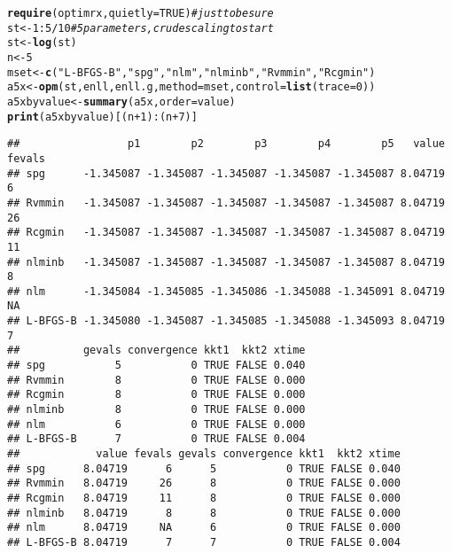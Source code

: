 \documentclass[11pt]{article}\usepackage[]{graphicx}\usepackage[]{color}
\makeatletter
\newcommand{\hlnum}[1]{\textcolor[rgb]{0.686,0.059,0.569}{#1}}%
\newcommand{\hlstr}[1]{\textcolor[rgb]{0.192,0.494,0.8}{#1}}%
\newcommand{\hlcom}[1]{\textcolor[rgb]{0.678,0.584,0.686}{\textit{#1}}}%
\newcommand{\hlopt}[1]{\textcolor[rgb]{0,0,0}{#1}}%
\newcommand{\hlstd}[1]{\textcolor[rgb]{0.345,0.345,0.345}{#1}}%
\newcommand{\hlkwb}[1]{\textcolor[rgb]{0.69,0.353,0.396}{#1}}%
\newcommand{\hlkwc}[1]{\textcolor[rgb]{0.333,0.667,0.333}{#1}}%
\newcommand{\hlkwd}[1]{\textcolor[rgb]{0.737,0.353,0.396}{\textbf{#1}}}%
\newenvironment{kframe}{%
 \def\at@end@of@kframe{}%
 \ifinner\ifhmode%
  \def\at@end@of@kframe{\end{minipage}}%
  \begin{minipage}{\columnwidth}%
 \fi\fi%
 \def\FrameCommand##1{\hskip\@totalleftmargin \hskip-\fboxsep
 \colorbox{shadecolor}{##1}\hskip-\fboxsep
     \hskip-\linewidth \hskip-\@totalleftmargin \hskip\columnwidth}%
 \MakeFramed {\advance\hsize-\width
   \@totalleftmargin\z@ \linewidth\hsize
   \@setminipage}}%
 {\par\unskip\endMakeFramed%
 \at@end@of@kframe}
\newenvironment{knitrout}{}{} %
\makeatother
\begin{document}
\begin{knitrout}\scriptsize
{}\color{fgcolor}\begin{kframe}
\begin{alltt}
\hlkwd{require}\hlstd{(optimrx,} \hlkwc{quietly}\hlstd{=}\hlnum{TRUE}\hlstd{)} \hlcom{# just to be sure}
\hlstd{st}\hlkwb{<-}\hlnum{1}\hlopt{:}\hlnum{5}\hlopt{/}\hlnum{10} \hlcom{# 5 parameters, crude scaling to start}
\hlstd{st}\hlkwb{<-}\hlkwd{log}\hlstd{(st)}
\hlstd{n} \hlkwb{<-} \hlnum{5}
\hlstd{mset}\hlkwb{<-}\hlkwd{c}\hlstd{(}\hlstr{"L-BFGS-B"}\hlstd{,} \hlstr{"spg"}\hlstd{,} \hlstr{"nlm"}\hlstd{,} \hlstr{"nlminb"}\hlstd{,} \hlstr{"Rvmmin"}\hlstd{,} \hlstr{"Rcgmin"}\hlstd{)}
\hlstd{a5x}\hlkwb{<-}\hlkwd{opm}\hlstd{(st, enll, enll.g,} \hlkwc{method}\hlstd{=mset,} \hlkwc{control}\hlstd{=}\hlkwd{list}\hlstd{(}\hlkwc{trace}\hlstd{=}\hlnum{0}\hlstd{))}
\hlstd{a5xbyvalue}\hlkwb{<-}\hlkwd{summary}\hlstd{(a5x,} \hlkwc{order}\hlstd{=value)}
\hlkwd{print}\hlstd{(a5xbyvalue)[(n}\hlopt{+}\hlnum{1}\hlstd{)}\hlopt{:}\hlstd{(n}\hlopt{+}\hlnum{7}\hlstd{)]}
\end{alltt}
\begin{verbatim}
##                 p1        p2        p3        p4        p5   value fevals
## spg      -1.345087 -1.345087 -1.345087 -1.345087 -1.345087 8.04719      6
## Rvmmin   -1.345087 -1.345087 -1.345087 -1.345087 -1.345087 8.04719     26
## Rcgmin   -1.345087 -1.345087 -1.345087 -1.345087 -1.345087 8.04719     11
## nlminb   -1.345087 -1.345087 -1.345087 -1.345087 -1.345087 8.04719      8
## nlm      -1.345084 -1.345085 -1.345086 -1.345088 -1.345091 8.04719     NA
## L-BFGS-B -1.345080 -1.345087 -1.345085 -1.345088 -1.345093 8.04719      7
##          gevals convergence kkt1  kkt2 xtime
## spg           5           0 TRUE FALSE 0.040
## Rvmmin        8           0 TRUE FALSE 0.000
## Rcgmin        8           0 TRUE FALSE 0.000
## nlminb        8           0 TRUE FALSE 0.000
## nlm           6           0 TRUE FALSE 0.000
## L-BFGS-B      7           0 TRUE FALSE 0.004
##            value fevals gevals convergence kkt1  kkt2 xtime
## spg      8.04719      6      5           0 TRUE FALSE 0.040
## Rvmmin   8.04719     26      8           0 TRUE FALSE 0.000
## Rcgmin   8.04719     11      8           0 TRUE FALSE 0.000
## nlminb   8.04719      8      8           0 TRUE FALSE 0.000
## nlm      8.04719     NA      6           0 TRUE FALSE 0.000
## L-BFGS-B 8.04719      7      7           0 TRUE FALSE 0.004
\end{verbatim}
\begin{alltt}

\end{alltt}
\end{kframe}
\end{knitrout}
\end{document}
